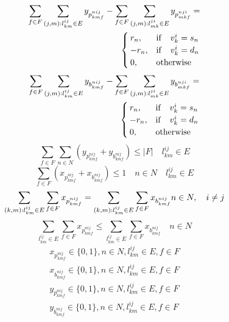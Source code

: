 \documentclass[a4j,twocolumn,fleqn]{jarticle}
\begin{document}
\begin{eqnarray}%
\sum_{f \in F}\sum_{(j,m):l^{ij}_{km}\in E}y_{p^{nij}_{kmf}} - \sum_{f \in F}\sum_{(j,m):l^{ji}_{mk}\in E}y_{p^{nji}_{mkf}}= \nonumber \\
\begin{cases}
r_n, & {\rm if}\quad v^i_k = s_n\\
-r_n, & {\rm if}\quad v^i_k =d_n\\
0, & {\rm otherwise}
\end{cases}
\end{eqnarray}
\begin{eqnarray}%
\sum_{f \in F}\sum_{(j,m):l^{ij}_{km}\in E}y_{b^{nij}_{kmf}} - \sum_{f \in F}\sum_{(j,m):l^{ji}_{mk}\in E}y_{b^{nji}_{mkf}}= \nonumber \\
\begin{cases}
r_n, & {\rm if}\quad v^i_k = s_n\\
-r_n, & {\rm if}\quad v^i_k =d_n\\
0, &{\rm otherwise}
\end{cases}
\end{eqnarray}
\begin{equation}%
\sum_{f \in F} \sum_{n \in N}(y_{p^{nij}_{kmf}}+y_{b^{nij}_{kmf}}) \leq |F| \quad  l^{ij}_{km} \in E
\end{equation}
\begin{equation}%
\sum_{f \in F}(x_{p^{nij}_{kmf}} + x_{b^{nij}_{kmf}}) \leq 1 \quad n \in N \quad l^{ij}_{km} \in E
\end{equation}
\begin{equation}%
\sum_{(k,m):l^{ij}_{km} \in E}\sum_{f \in F}x_{p^{nij}_{kmf}} = \sum_{(k,m):l^{ij}_{km}\in E}\sum_{f \in F}x_{b^{nij}_{kmf}} \\
n \in N,\quad i \neq j
\end{equation}
\begin{equation}%
\sum_{l^{ij}_{km}\in E}\sum_{f \in F}x_{p^{nij}_{kmf}} \leq \sum_{l^{ij}_{km}\in E}\sum_{f \in F}x_{b^{nij}_{kmf}}\quad n \in N
\end{equation}
\begin{eqnarray}
x_{p^{nij}_{kmf}} \in \{0,1\},n \in N,l^{ij}_{km}\in E,f \in F\\
x_{b^{nij}_{kmf}} \in \{0,1\},n \in N,l^{ij}_{km}\in E,f \in F\\
y_{p^{nij}_{kmf}} \in \{0,1\},n \in N,l^{ij}_{km}\in E,f \in F\\
y_{b^{nij}_{kmf}} \in \{0,1\},n \in N,l^{ij}_{km}\in E,f \in F
\end{eqnarray}
\end{document}
